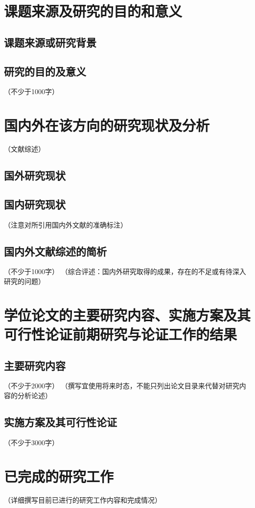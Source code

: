 \documentclass[doctype=proposal,printmode=final]{sysuthesis}
\begin{document}
    
\section{课题来源及研究的目的和意义}
\subsection{课题来源或研究背景}
\subsection{研究的目的及意义}
（不少于1000字）

\section{国内外在该方向的研究现状及分析}
（文献综述）
\subsection{国外研究现状}
\subsection{国内研究现状}
（注意对所引用国内外文献的准确标注）
\subsection{国内外文献综述的简析}
（不少于1000字）
（综合评述：国内外研究取得的成果，存在的不足或有待深入研究的问题）

\section{学位论文的主要研究内容、实施方案及其可行性论证前期研究与论证工作的结果}
\subsection{主要研究内容}
（不少于2000字）
（撰写宜使用将来时态，不能只列出论文目录来代替对研究内容的分析论述）
\subsection{实施方案及其可行性论证}
（不少于3000字）

\section{已完成的研究工作}
（详细撰写目前已进行的研究工作内容和完成情况）
\end{document}
